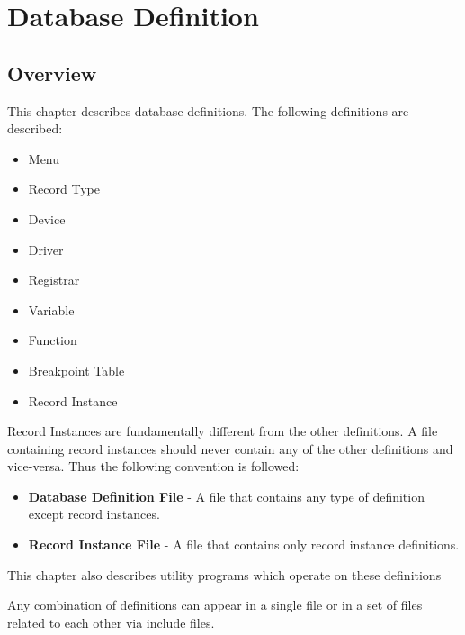 \chapter{Database Definition}

\section{Overview}

This chapter describes database definitions. The following definitions are described:

\begin{itemize}\item Menu

\item Record Type

\item Device

\item Driver

\item Registrar

\item Variable

\item Function

\item Breakpoint Table

\item Record Instance

\end{itemize}Record Instances are fundamentally different from the other definitions. A file containing record instances should never 
contain any of the other definitions and vice-versa. Thus the following convention is followed:

\begin{itemize}\item {}\textbf{Database Definition File} - A file that contains any type of definition except record instances.

\item {}\textbf{Record Instance File} - A file that contains only record instance definitions.

\end{itemize}This chapter also describes utility programs which operate on these definitions

Any combination of definitions can appear in a single file or in a set of files related to each other via include files.

